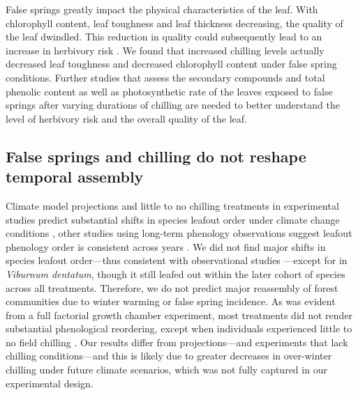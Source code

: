 \documentclass{article}\usepackage[]{graphicx}\usepackage[]{color}
\begin{document}
False springs greatly impact the physical characteristics of the leaf. With chlorophyll content, leaf toughness and leaf thickness decreasing, the quality of the leaf dwindled. This reduction in quality could subsequently lead to an increase in herbivory risk \citep{Onoda2011}. We found that increased chilling levels actually decreased leaf toughness and decreased chlorophyll content under false spring conditions. Further studies that assess the secondary compounds and total phenolic content \citep{Ayres1993, Webber2016} as well as photosynthetic rate of the leaves exposed to false springs after varying durations of chilling are needed to better understand the level of herbivory risk and the overall quality of the leaf. 

\subsection*{False springs and chilling do not reshape temporal assembly}
Climate model projections and little to no chilling treatments in experimental studies predict substantial shifts in species leafout order under climate change conditions \citep{Roberts2015, Laube2014}, other studies using long-term phenology observations suggest leafout phenology order is consistent across years \citep{Wesolowski2006}. We did not find major shifts in species leafout order---thus consistent with observational studies \citep{Wesolowski2006}---except for in \textit{Viburnum dentatum}, though it still leafed out within the later cohort of species across all treatments. Therefore, we do not predict major reassembly of forest communities due to winter warming or false spring incidence. As was evident from a full factorial growth chamber experiment, most treatments did not render substantial phenological reordering, except when individuals experienced little to no field chilling \citep{Laube2014}. Our results differ from projections---and experiments that lack chilling conditions---and this is likely due to greater decreases in over-winter chilling under future climate scenarios, which was not fully captured in our experimental design. %
    
\end{document}
